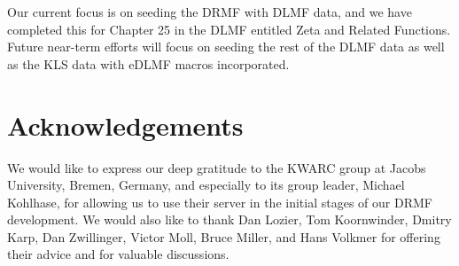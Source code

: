 \documentclass{easychair}
\newcommand{\easychair}{\textsf{easychair}}
\begin{document}
Our current focus is on seeding the 
DRMF with DLMF data, and we have completed this for Chapter 25 in the DLMF entitled
Zeta and Related Functions.  Future near-term efforts will focus on seeding the rest of 
the DLMF data as well as the KLS data with eDLMF macros incorporated.  


\section*{Acknowledgements}

We would like to express our deep gratitude to the KWARC group at Jacobs University,
Bremen, Germany, and especially to its group leader, Michael Kohlhase, for allowing 
us to use their server in the initial stages of our DRMF development.  We would
also like to thank Dan Lozier, Tom Koornwinder, Dmitry Karp, Dan Zwillinger, 
Victor Moll, Bruce Miller, and Hans Volkmer for offering their advice and for
valuable discussions.

%
\label{sect:bib}

%
%
%






\end{document}
